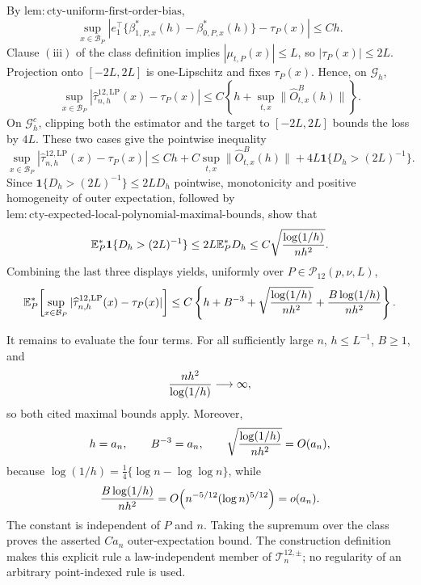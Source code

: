 By \(\mathrm{lem:cty\text{-}uniform\text{-}first\text{-}order\text{-}bias}\),
\[
 \sup_{x\in\mathcal B_P}
 \left|e_1^\top\{\beta^*_{1,P,x}(h)-\beta^*_{0,P,x}(h)\}-\tau_P(x)\right|
 \leq Ch.
\]
Clause \(\mathrm{(iii)}\) of the class definition implies \(|\mu_{t,P}(x)|\leq L\), so \(|\tau_P(x)|\leq2L\).  Projection onto \([-2L,2L]\) is one-Lipschitz and fixes \(\tau_P(x)\).  Hence, on \(\mathcal G_h\),
\[
 \sup_{x\in\mathcal B_P}
 |\widehat\tau^{12,\mathrm{LP}}_{n,h}(x)-\tau_P(x)|
 \leq C\left\{h+\sup_{t,x}\|\widehat O^B_{t,x}(h)\|\right\}.
\]
On \(\mathcal G_h^c\), clipping both the estimator and the target to \([-2L,2L]\) bounds the loss by \(4L\).  These two cases give the pointwise inequality
\[
 \sup_{x\in\mathcal B_P}
 |\widehat\tau^{12,\mathrm{LP}}_{n,h}(x)-\tau_P(x)|
 \leq Ch+C\sup_{t,x}\|\widehat O^B_{t,x}(h)\|
 +4L\mathbf1\{D_h>(2L)^{-1}\}.
\]
Since \(\mathbf1\{D_h>(2L)^{-1}\}\leq2LD_h\) pointwise, monotonicity and positive homogeneity of outer expectation, followed by \(\mathrm{lem:cty\text{-}expected\text{-}local\text{-}polynomial\text{-}maximal\text{-}bounds}\), show that
\[
 \mathbb E_P^*\mathbf1\{D_h>(2L)^{-1}\}
 \leq2L\mathbb E_P^*D_h
 \leq C\sqrt{{\log(1/h)\over nh^2}}.
\]
Combining the last three displays yields, uniformly over \(P\in\mathcal P_{12}(p,\nu,L)\),
\[
 \mathbb E_P^*\!\left[
 \sup_{x\in\mathcal B_P}
 |\widehat\tau^{12,\mathrm{LP}}_{n,h}(x)-\tau_P(x)|
 \right]
 \leq C\left\{
 h+B^{-3}+\sqrt{{\log(1/h)\over nh^2}}
 +{B\log(1/h)\over nh^2}
 \right\}.
\]

It remains to evaluate the four terms.  For all sufficiently large \(n\), \(h\leq L^{-1}\), \(B\geq1\), and
\[
 {nh^2\over\log(1/h)}\longrightarrow\infty,
\]
so both cited maximal bounds apply.  Moreover,
\[
 h=a_n,\qquad B^{-3}=a_n,
 \qquad \sqrt{{\log(1/h)\over nh^2}}=O(a_n),
\]
because \(\log(1/h)=\tfrac14\{\log n-\log\log n\}\), while
\[
 {B\log(1/h)\over nh^2}
 =O\!\left(n^{-5/12}(\log n)^{5/12}\right)
 =o(a_n).
\]
The constant is independent of \(P\) and \(n\).  Taking the supremum over the class proves the asserted \(Ca_n\) outer-expectation bound.  The construction definition makes this explicit rule a law-independent member of \(\mathcal T_n^{12,\pm}\); no regularity of an arbitrary point-indexed rule is used.